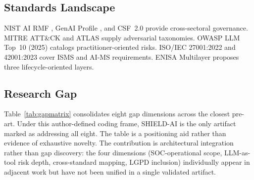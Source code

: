 \documentclass[journal]{IEEEtran}
\begin{document}
\subsection{Standards Landscape}
NIST AI RMF \cite{nist2023airmf}, GenAI Profile \cite{nist2024genai}, and CSF~2.0
\cite{nist2024csf} provide cross-sectoral governance. MITRE ATT\&CK \cite{mitre2024attck}
and ATLAS \cite{mitre2025atlas} supply adversarial taxonomies. OWASP LLM Top~10 (2025)
\cite{owasp2025llm} catalogs practitioner-oriented risks. ISO/IEC 27001:2022 \cite{iso27001}
and 42001:2023 \cite{iso42001} cover ISMS and AI-MS requirements. ENISA Multilayer
\cite{enisa2023multilayer} proposes three lifecycle-oriented layers.

\subsection{Research Gap}
Table~\ref{tab:gapmatrix} consolidates eight gap dimensions across the closest pre-art.
Under this author-defined coding frame, SHIELD-AI is the only artifact marked as addressing
all eight. The table is a positioning aid rather than evidence of exhaustive novelty. The contribution is architectural
integration rather than gap discovery: the four dimensions (SOC-operational scope, LLM-as-tool
risk depth, cross-standard mapping, LGPD inclusion) individually appear in adjacent work but
have not been unified in a single validated artifact.

\begin{table}[!t]
\renewcommand{\arraystretch}{1.2}
\caption{Research gap matrix. $\checkmark$=primary, $\sim$=partial, n/a=not covered.}
\label{tab:gapmatrix}
\centering
\scriptsize
{}%
\end{table}
\end{document}
